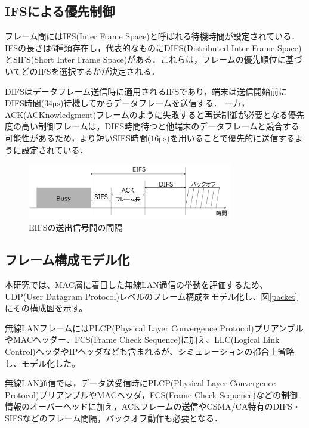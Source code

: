 \documentclass[a4paper,10pt]{ltjsarticle}
\begin{document}
\clearpage

\subsection{IFSによる優先制御}

フレーム間にはIFS(Inter Frame Space)と呼ばれる待機時間が設定されている．IFSの長さは6種類存在し，代表的なものにDIFS(Distributed Inter Frame Space)とSIFS(Short Inter Frame Space)がある．これらは，フレームの優先順位に基づいてどのIFSを選択するかが決定される．

DIFSはデータフレーム送信時に適用されるIFSであり，端末は送信開始前にDIFS時間($34\mathrm{\mu s}$)待機してからデータフレームを送信する．
一方，ACK(ACKnowledgment)フレームのように失敗すると再送制御が必要となる優先度の高い制御フレームは，DIFS時間待つと他端末のデータフレームと競合する可能性があるため，より短いSIFS時間($16\mathrm{\mu s}$)を用いることで優先的に送信するように設定されている．

\begin{figure}[H]
  \centering
  \includegraphics[width=0.8\textwidth]{./assets/EIFS.png}
  \caption{EIFSの送出信号間の間隔}
  \label{eifs}
\end{figure}


\subsection{フレーム構成モデル化}

本研究では、MAC層に着目した無線LAN通信の挙動を評価するため、UDP(User Datagram Protocol)レベルのフレーム構成をモデル化し、図\ref{packet}にその構成図を示す。

無線LANフレームにはPLCP(Physical Layer Convergence Protocol)プリアンブルやMACヘッダー、FCS(Frame Check Sequence)に加え、LLC(Logical Link Control)ヘッダやIPヘッダなども含まれるが、シミュレーションの都合上省略し、モデル化した。

無線LAN通信では，データ送受信時にPLCP(Physical Layer Convergence Protocol)プリアンブルやMACヘッダ，FCS(Frame Check Sequence)などの制御情報のオーバーヘッドに加え，ACKフレームの送信やCSMA/CA特有のDIFS・SIFSなどのフレーム間隔，バックオフ動作も必要となる．
\end{document}
